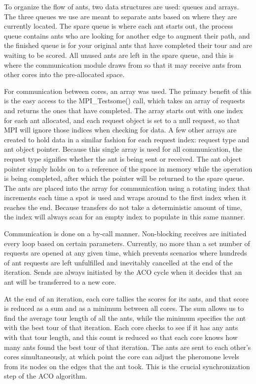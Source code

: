 \documentclass{acm_proc_article-sp}
\begin{document}
To organize the flow of ants, two data structures are used: queues and arrays.
The three queues we use are meant to separate ants based on where they are
currently located. The spare queue is where each ant starts out, the process
queue contains ants who are looking for another edge to augment their path, and the
finished queue is for your original ants that have completed their tour and are
waiting to be scored. All unused ants are left in the spare queue, and this is
where the communication module draws from so that it may receive ants from other
cores into the pre-allocated space. 

For communication between cores, an array was used. The primary benefit of this
is the easy access to the MPI\_Testsome() call, which takes an array of requests
and returns the ones that have completed. The array starts out with one index
for each ant allocated, and each request object is set to a null request, so
that MPI will ignore those indices when checking for data. A few other arrays
are created to hold data in a similar fashion for each request index: request
type and ant object pointer. Because this single array is used for all
communication, the request type signifies whether the ant is being sent or
received. The ant object pointer simply holds on to a reference of the space in
memory while the operation is being completed, after which the pointer will be
returned to the spare queue. The ants are placed into the array for
communication using a rotating index that increments each time a spot is used
and wraps around to the first index when it reaches the end. Because transfers
do not take a deterministic amount of time, the index will always scan for an
empty index to populate in this same manner. 

Communication is done on a by-call manner. Non-blocking receives are initiated
every loop based on certain parameters. Currently, no more than a set number
of requests are opened at any given time, which prevents scenarios where
hundreds of ant requests are left unfulfilled and inevitably cancelled at the end
of the iteration. Sends are always initiated by the ACO cycle when it decides
that an ant will be transferred to a new core.

At the end of an iteration, each core tallies the scores for its ants, and that
score is reduced as a sum and as a minimum between all cores. The sum allows us
to find the average tour length of all the ants, while the minimum specifies the
ant with the best tour of that iteration. Each core checks to see if it has any
ants with that tour length, and this count is reduced so that each core knows
how many ants found the best tour of that iteration. The ants are sent to each
other's cores simultaneously, at which point the core can adjust the pheromone
levels from its nodes on the edges that the ant took. This is the crucial
synchronization step of the ACO algorithm. 
\end{document}
